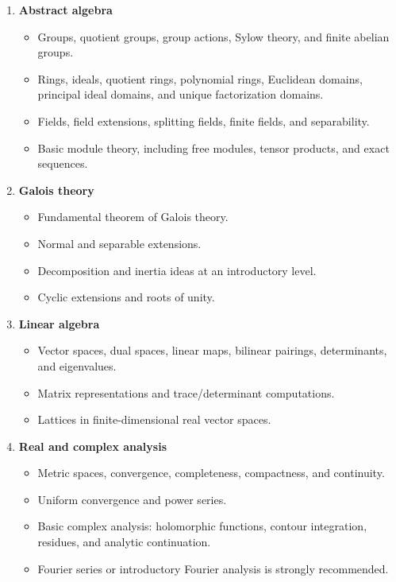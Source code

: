 \documentclass[11pt]{article}
\begin{document}
\begin{enumerate}
    \item \textbf{Abstract algebra}
    \begin{itemize}
        \item Groups, quotient groups, group actions, Sylow theory, and finite abelian groups.
        \item Rings, ideals, quotient rings, polynomial rings, Euclidean domains, principal ideal domains, and unique factorization domains.
        \item Fields, field extensions, splitting fields, finite fields, and separability.
        \item Basic module theory, including free modules, tensor products, and exact sequences.
    \end{itemize}

    \item \textbf{Galois theory}
    \begin{itemize}
        \item Fundamental theorem of Galois theory.
        \item Normal and separable extensions.
        \item Decomposition and inertia ideas at an introductory level.
        \item Cyclic extensions and roots of unity.
    \end{itemize}

    \item \textbf{Linear algebra}
    \begin{itemize}
        \item Vector spaces, dual spaces, linear maps, bilinear pairings, determinants, and eigenvalues.
        \item Matrix representations and trace/determinant computations.
        \item Lattices in finite-dimensional real vector spaces.
    \end{itemize}

    \item \textbf{Real and complex analysis}
    \begin{itemize}
        \item Metric spaces, convergence, completeness, compactness, and continuity.
        \item Uniform convergence and power series.
        \item Basic complex analysis: holomorphic functions, contour integration, residues, and analytic continuation.
        \item Fourier series or introductory Fourier analysis is strongly recommended.
    \end{itemize}


\end{enumerate}
\end{document}
